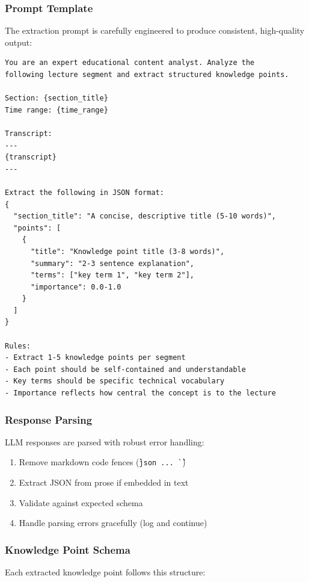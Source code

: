 \documentclass[12pt,a4paper]{article}
\begin{document}
\subsubsection{Prompt Template}

The extraction prompt is carefully engineered to produce consistent, high-quality output:

\begin{lstlisting}[language=text, caption={Fine-Grained Extraction Prompt}]
You are an expert educational content analyst. Analyze the 
following lecture segment and extract structured knowledge points.

Section: {section_title}
Time range: {time_range}

Transcript:
---
{transcript}
---

Extract the following in JSON format:
{
  "section_title": "A concise, descriptive title (5-10 words)",
  "points": [
    {
      "title": "Knowledge point title (3-8 words)",
      "summary": "2-3 sentence explanation",
      "terms": ["key term 1", "key term 2"],
      "importance": 0.0-1.0
    }
  ]
}

Rules:
- Extract 1-5 knowledge points per segment
- Each point should be self-contained and understandable
- Key terms should be specific technical vocabulary
- Importance reflects how central the concept is to the lecture
\end{lstlisting}

\subsubsection{Response Parsing}

LLM responses are parsed with robust error handling:

\begin{enumerate}
    \item Remove markdown code fences (\texttt{\`\`\`json ... \`\`\`})
    \item Extract JSON from prose if embedded in text
    \item Validate against expected schema
    \item Handle parsing errors gracefully (log and continue)
\end{enumerate}

\subsubsection{Knowledge Point Schema}

Each extracted knowledge point follows this structure:
\end{document}
